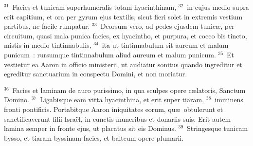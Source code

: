 ${}^{31}$~Facies et tunicam superhumeralis totam hyacinthinam,
${}^{32}$~in cujus medio supra erit capitium, et ora per gyrum ejus textilis, sicut fieri solet in extremis vestium partibus, ne facile rumpatur.
${}^{33}$~Deorsum vero, ad pedes ejusdem tunic\ae , per circuitum, quasi mala punica facies, ex hyacintho, et purpura, et cocco bis tincto, mistis in medio tintinnabulis,
${}^{34}$~ita ut tintinnabulum sit aureum et malum punicum~: rursumque tintinnabulum aliud aureum et malum punicum.
${}^{35}$~Et vestietur ea Aaron in officio ministerii, ut audiatur sonitus quando ingreditur et egreditur sanctuarium in conspectu Domini, et non moriatur.


${}^{36}$~Facies et laminam de auro purissimo, in qua sculpes opere c\ae latoris, Sanctum Domino.
${}^{37}$~Ligabisque eam vitta hyacinthina, et erit super tiaram,
${}^{38}$~imminens fronti pontificis. Portabitque Aaron iniquitates eorum, qu\ae\ obtulerunt et sanctificaverunt filii Isra\"el, in cunctis muneribus et donariis suis. Erit autem lamina semper in fronte ejus, ut placatus sit eis Dominus.
${}^{39}$~Stringesque tunicam bysso, et tiaram byssinam facies, et balteum opere plumarii.


